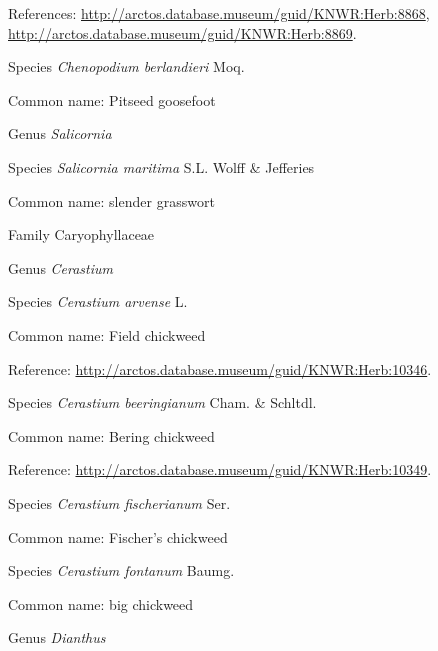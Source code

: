 \documentclass[9pt, article]{memoir}
\begin{document}
\begin{multicols}{2}
References: 
\url{http://arctos.database.museum/guid/KNWR:Herb:8868}, 
\url{http://arctos.database.museum/guid/KNWR:Herb:8869}.

\vspace{6pt}\noindent\hspace{36pt}Species \textit{Chenopodium berlandieri} Moq.


Common name: Pitseed goosefoot

\vspace{6pt}\noindent\hspace{30pt}Genus \textit{Salicornia}


\vspace{6pt}\noindent\hspace{36pt}Species \textit{Salicornia maritima} S.L. Wolff \& Jefferies


Common name: slender grasswort

\vspace{6pt}\noindent\hspace{24pt}Family Caryophyllaceae


\vspace{6pt}\noindent\hspace{30pt}Genus \textit{Cerastium}


\vspace{6pt}\noindent\hspace{36pt}Species \textit{Cerastium arvense} L.


Common name: Field chickweed

Reference: 
\url{http://arctos.database.museum/guid/KNWR:Herb:10346}.

\vspace{6pt}\noindent\hspace{36pt}Species \textit{Cerastium beeringianum} Cham. \& Schltdl.


Common name: Bering chickweed

Reference: 
\url{http://arctos.database.museum/guid/KNWR:Herb:10349}.

\vspace{6pt}\noindent\hspace{36pt}Species \textit{Cerastium fischerianum} Ser.


Common name: Fischer's chickweed

\vspace{6pt}\noindent\hspace{36pt}Species \textit{Cerastium fontanum} Baumg.


Common name: big chickweed

\vspace{6pt}\noindent\hspace{30pt}Genus \textit{Dianthus}



\end{multicols}
\end{document}
